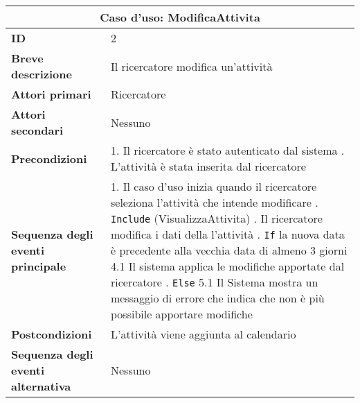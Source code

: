 \documentclass[11pt,a4paper]{report}
\begin{document}
\newpage



\begin{table}[h!]
\centering
\renewcommand{\arraystretch}{1.3}
\begin{tabular}{|p{4.2cm}|p{10.2cm}|}
\hline
\multicolumn{2}{|c|}{\textbf{Caso d’uso:  ModificaAttivita}} \\ \hline
\textbf{ID} & 2 \\ \hline
\textbf{Breve descrizione} & Il ricercatore modifica un'attività \\ \hline
\textbf{Attori primari} & Ricercatore \\ \hline
\textbf{Attori secondari} & Nessuno \\ \hline
\textbf{Precondizioni} & 
1. Il ricercatore è stato autenticato dal sistema \newline
2. L'attività è stata inserita dal ricercatore \\ \hline
\textbf{Sequenza degli eventi principale} &
1. Il caso d’uso inizia quando il ricercatore seleziona l'attività che intende modificare \newline
2. \texttt{Include} (VisualizzaAttivita) \newline
3. Il ricercatore modifica i dati della l'attività \newline
4. \texttt{If} la nuova data è precedente alla vecchia data di almeno 3 giorni \newline
\hspace*{0.5cm} 4.1 Il sistema applica le modifiche apportate dal ricercatore \newline
5. \texttt{Else} \newline
\hspace*{0.5cm} 5.1 Il Sistema mostra un messaggio di errore che indica che non è più possibile apportare modifiche \\ \hline
\textbf{Postcondizioni} & L'attività viene aggiunta al calendario \\ \hline
\textbf{Sequenza degli eventi alternativa} & Nessuno \\ \hline
\end{tabular}
\end{table}
\newpage

\end{document}

